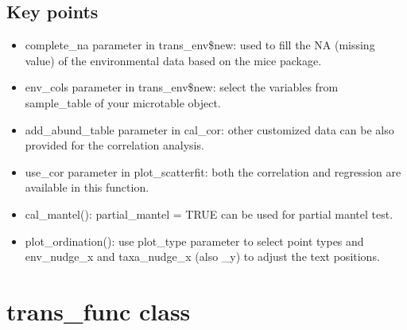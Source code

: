 \documentclass[
]{book}
\newenvironment{Shaded}{\begin{snugshade}}{\end{snugshade}}
\newcommand{\AttributeTok}[1]{\textcolor[rgb]{0.13,0.29,0.53}{#1}}
\newcommand{\CommentTok}[1]{\textcolor[rgb]{0.56,0.35,0.01}{\textit{#1}}}
\newcommand{\DecValTok}[1]{\textcolor[rgb]{0.00,0.00,0.81}{#1}}
\newcommand{\FloatTok}[1]{\textcolor[rgb]{0.00,0.00,0.81}{#1}}
\newcommand{\FunctionTok}[1]{\textcolor[rgb]{0.13,0.29,0.53}{\textbf{#1}}}
\newcommand{\NormalTok}[1]{#1}
\newcommand{\OtherTok}[1]{\textcolor[rgb]{0.56,0.35,0.01}{#1}}
\newcommand{\SpecialCharTok}[1]{\textcolor[rgb]{0.81,0.36,0.00}{\textbf{#1}}}
\newcommand{\StringTok}[1]{\textcolor[rgb]{0.31,0.60,0.02}{#1}}
\providecommand{\tightlist}{%
  \setlength{\itemsep}{0pt}\setlength{\parskip}{0pt}}
\begin{document}
\begin{Shaded}
\end{Shaded}

\subsection{Key points}\label{key-points-10}

\begin{itemize}
\tightlist
\item
  complete\_na parameter in trans\_env\$new: used to fill the NA (missing value) of the environmental data based on the mice package.
\item
  env\_cols parameter in trans\_env\$new: select the variables from sample\_table of your microtable object.
\item
  add\_abund\_table parameter in cal\_cor: other customized data can be also provided for the correlation analysis.
\item
  use\_cor parameter in plot\_scatterfit: both the correlation and regression are available in this function.
\item
  cal\_mantel(): partial\_mantel = TRUE can be used for partial mantel test.
\item
  plot\_ordination(): use plot\_type parameter to select point types and env\_nudge\_x and taxa\_nudge\_x (also \_y) to adjust the text positions.
\end{itemize}

\section{trans\_func class}\label{trans_func-class}
\end{document}
